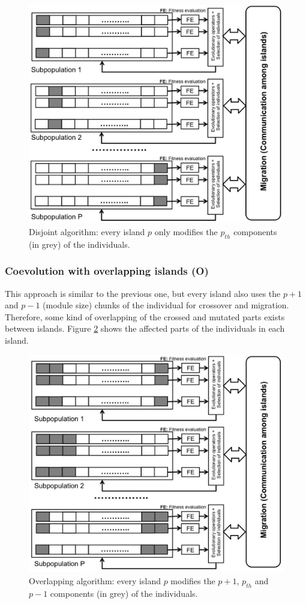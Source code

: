 \documentclass[Afour,sageh,times]{sagej}
\begin{document}
\begin{figure}
\centering
\includegraphics[width=12cm]{islandDisjoint.jpg}
\caption{Disjoint algorithm: every island $p$ only modifies the $p_{th}$ components (in grey) of the individuals.}
\label{fig:disjoint}
\end{figure}

\subsubsection{Coevolution with overlapping islands (O)}
This approach is similar to the previous one, but every island also uses the $p+1$ and $p-1$ (module size) chunks of the individual for crossover and migration. Therefore, some kind of overlapping of the crossed and mutated parts exists between islands. Figure \ref{fig:overlapping} shows the affected parts of the individuals in
each island. 

\begin{figure}
\centering
\includegraphics[width=12cm]{islandNoDisjoint.jpg}
\caption{Overlapping algorithm: every island $p$ modifies the  $p+1$,
  $p_{th}$ and $p-1$  components (in grey) of the individuals.}
  \label{fig:overlapping}
\end{figure}
\end{document}
